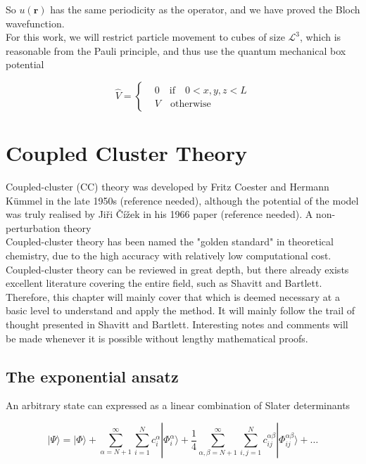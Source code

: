 \documentclass[10pt]{report}
\begin{document}
	So $u(\bm{r})$ has the same periodicity as the operator, and we have proved the Bloch wavefunction.\\
	
	For this work, we will restrict particle movement to cubes of size $\mathcal{L}^3$, which is reasonable from the Pauli principle, and thus use the quantum mechanical box potential
	
	\begin{equation}
		\hat{V} = \begin{cases}
		&0 \quad\text{if}\quad 0<x,y,z<L \\
		&V \quad\text{otherwise}
		\end{cases}
	\end{equation}
	
	
	
	\newpage
	\chapter{Coupled Cluster Theory}
	Coupled-cluster (CC) theory was developed by Fritz Coester and Hermann K\"ummel in the late 1950s (reference needed), although the potential of the model was truly realised by Ji\v{r}i \v{C}\'{i}\v{z}ek in his 1966 paper (reference needed). A non-perturbation theory \\
	
	Coupled-cluster theory has been named the "golden standard" in theoretical chemistry, due to the high accuracy with relatively low computational cost.\\
	
	Coupled-cluster theory can be reviewed in great depth, but there already exists excellent literature covering the entire field, such as Shavitt and Bartlett. Therefore, this chapter will mainly cover that which is deemed necessary at a basic level to understand and apply the method. It will mainly follow the trail of thought presented in Shavitt and Bartlett. Interesting notes and comments will be made whenever it is possible without lengthy mathematical proofs.
	
	
	\section{The exponential ansatz}
	An arbitrary state can expressed as a linear combination of Slater determinants
	
	\begin{equation}
		|\Psi\rangle = |\Phi\rangle + \sum_{\alpha=N+1}^\infty\sum_{i=1}^Nc_i^\alpha|\Phi_i^\alpha\rangle + \frac{1}{4}\sum_{\alpha,\beta=N+1}^\infty\sum_{i,j=1}^Nc_{ij}^{\alpha\beta}|\Phi_{ij}^{\alpha\beta}\rangle +\ldots
		\label{EQ 3.1 general WF}
	\end{equation}
	
\end{document}
